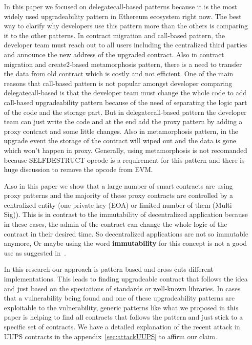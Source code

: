 In this paper we focused on delegatecall-based patterns because it is the most widely used upgradeability pattern in Ethereum ecosystem right now. The best way to clarify why developers use this pattern more than the others is comparing it to the other patterns. In contract migration and call-based pattern, the developer team must reach out to all users including the centralized third parties and announce the new address of the upgraded contract. Also in contract migration and create2-based metamorphosis pattern, there is a need to transfer the data from old contract which is costly and not efficient. One of the main reasons that call-based pattern is not popular amongst developer comparing delegatecall-based is that the developer team must change the whole code to add call-based upgradeability pattern because of the need of separating the logic part of the code and the storage part. But in delegatecall-based pattern the developer team can just write the code and at the end add the proxy pattern by adding a proxy contract and some little changes. Also in metamorphosis pattern, in the upgrade event the storage of the contract will wiped out and the data is gone which won't happen in proxy. Generally, using metamorphosis is not recomanded because SELFDESTRUCT opcode is a requirement for this pattern and there is huge discussion to remove the opcode from EVM.

Also in this paper we show that a large number of smart contracts are using proxy patterns and the majority of these proxy contracts are controlled by a centralized entity (one private key (EOA) or limited number of them (Multi-Sig)). This is in contrast to the immutability of decentralized application because in these cases, the admin of the contract can change the whole logic of the contract in their desired time. So decentralized applications are not so immutable anymore, Or maybe using the word \textbf{immutability} for this concept is not a good use as suggested in~\cite{walch2016path}.

In this research our approach is pattern-based and cross cuts different implementations. This leads to finding upgradeable contract that follows the idea and just based on the speciations of standards or well-known libraries. In cases that a vulnerability being found and one of these upgradeability patterns are exploitable to the vulnerability, generic patterns like what we proposed in this paper is helping to find all contracts that follows the pattern and just stick to a specific set of contracts. We have a detailed explanation of the recent attack in UUPS contracts in the appendix~\ref{sec:attackUUPS} to affirm our claim. 

